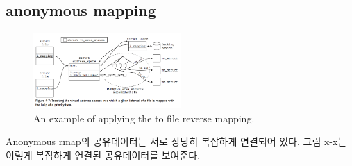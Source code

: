 


\subsection{anonymous mapping}

\begin{figure}[tb]
  \begin{center}
     \includegraphics[width=0.5\textwidth,height=0.5\textheight,keepaspectratio]{fig/anon_vma_sample}
  \end{center}
  \caption{An example of applying the  to file reverse mapping. }
  \label{fig:deferu2}
\end{figure}


Anonymous rmap의 공유데이터는 서로 상당히 복잡하게 연결되어 있다.
그림 x-x는 이렇게 복잡하게 연결된 공유데이터를 보여준다. 


